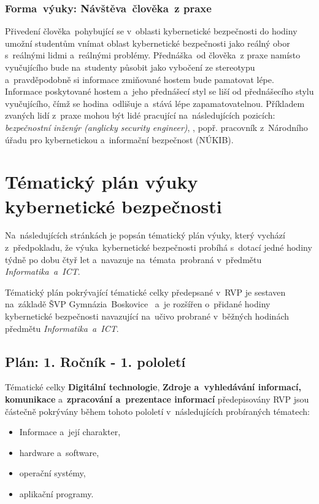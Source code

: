 \documentclass[a4paper, 12pt]{article}
\begin{document}
\subsubsection{Forma~výuky: Návštěva~člověka~z praxe}
Přivedení člověka~pohybující se v~oblasti kybernetické bezpečnosti do hodiny umožní studentům vnímat oblast kybernetické bezpečnosti jako reálný obor s~reálnými lidmi a~reálnými problémy. Přednáška~od člověka~z praxe namísto vyučujícího bude na~studenty působit jako vybočení ze stereotypu a~pravděpodobně si informace zmiňované hostem bude pamatovat lépe. Informace poskytované hostem a~jeho přednášecí styl se liší od přednášecího stylu vyučujícího, čímž se hodina~odlišuje a~stává lépe zapamatovatelnou. Příkladem zvaných lidí z~praxe mohou být lidé pracující na~následujících pozicích: \textit{bezpečnostní inženýr (anglicky security engineer)}, , popř. pracovník z~Národního úřadu pro kybernetickou a~informační bezpečnost (NÚKIB).




\newpage
\section{Tématický plán výuky kybernetické bezpečnosti}

Na~následujících stránkách je popsán tématický plán výuky, který vychází z~předpokladu, že výuka~kybernetické bezpečnosti probíhá s~dotací jedné hodiny týdně po dobu čtyř let a~navazuje na~témata~probraná v~předmětu \textit{Informatika~a~ICT}. 

Tématický plán pokrývající tématické celky předepsané v~RVP je sestaven na~základě ŠVP Gymnázia~Boskovice~\cite{svpGymbos} a~je rozšířen o~přidané hodiny kybernetické bezpečnosti navazující na~učivo probrané v~běžných hodinách předmětu \textit{Informatika~a~ICT}.

\subsection{Plán: 1. Ročník - 1. pololetí}

Tématické celky \textbf{Digitální technologie}, \textbf{Zdroje a~vyhledávání informací, komunikace} a~\textbf{zpracování a~prezentace informací} předepisovány RVP jsou částečně pokrývány během tohoto pololetí v~následujících probíraných tématech:
\begin{itemize}
    \setlength{\itemsep}{-3pt}
    \item Informace a~její charakter,
    \item hardware a~software,
    \item operační systémy,
    \item aplikační programy.
\end{itemize}
\end{document}
